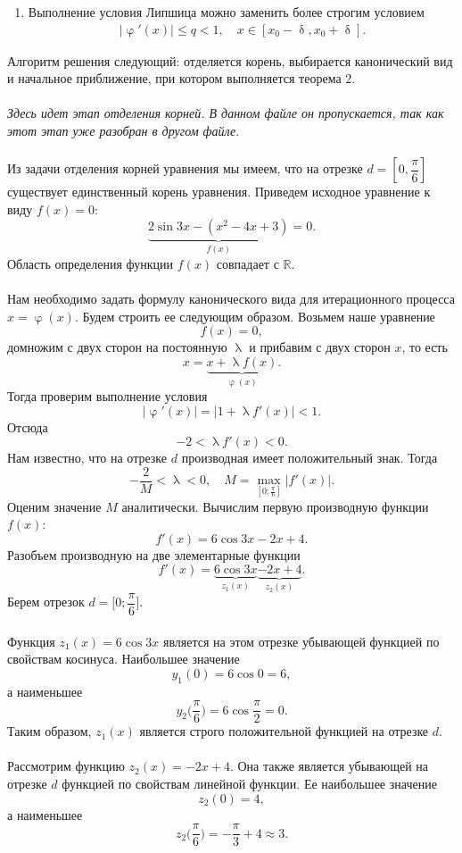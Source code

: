 \documentclass[a4paper, 12pt]{article}
\newcommand{\Rm}{\mathbb{R}}
\renewcommand{\leq}{\leqslant}
\renewcommand{\delta}{\updelta}
\renewcommand{\varphi}{\upvarphi}
\renewcommand{\lambda}{\uplambda}
\begin{document}
\begin{enumerate}
\begin{enumerate}
\begin{enumerate}
			\end{enumerate}
			\item Выполнение условия Липшица можно заменить более строгим условием 
			\begin{eqnarray}
				|\varphi'(x)| \leq q < 1,\quad x \in [x_0-\delta, x_0 + \delta].
			\end{eqnarray}
		\end{enumerate}
		Алгоритм решения следующий: отделяется корень, выбирается канонический вид и начальное приближение, при котором выполняется теорема 2.\\\\
		\textit{Здесь идет этап отделения корней. В данном файле он пропускается, так как этот этап уже разобран в другом файле}.\\\\
		Из задачи отделения корней уравнения мы имеем, что на отрезке $d = \left[0, \dfrac\pi6\right]$ существует единственный корень уравнения. Приведем исходное уравнение к виду $f(x) = 0$: $$\underbrace{2\sin 3x - (x^2 - 4x+3)}_{f(x)} = 0.$$
		Область определения функции $f(x)$ совпадает с $\Rm$.\\\\
		Нам необходимо задать формулу канонического вида для итерационного процесса $x = \varphi(x)$. Будем строить ее следующим образом. Возьмем наше уравнение $$f(x) = 0,$$ домножим с двух сторон на постоянную $\lambda$ и прибавим с двух сторон $x$, то есть $$x = \underbrace{x + \lambda f(x)}_{\varphi(x)}.$$ Тогда проверим выполнение условия $$|\varphi'(x)| = |1 + \lambda f'(x)| < 1.$$
		Отсюда $$-2< \lambda f'(x)< 0.$$ Нам известно, что на отрезке $d$ производная имеет положительный знак. Тогда $$-\dfrac{2}{M} < \lambda < 0,\quad M = \max_{[0; \frac\pi6]}|f'(x)|.$$
		Оценим значение $M$ аналитически. Вычислим первую производную функции $f(x)$:
		$$f'(x) = 6\cos 3x - 2x + 4.$$
		Разобъем производную на две элементарные функции
		$$f'(x) = \underbrace{6\cos3x}_{z_1(x)} \underbrace{- 2x + 4}_{z_2(x)}.$$
		Берем отрезок $d = \Big[0; \dfrac\pi6\Big]$. 
		\\\\
		Функция $z_1(x) = 6\cos3x$ является на этом отрезке убывающей функцией по свойствам косинуса. Наибольшее значение $$y_1(0)= 6\cos0 = 6,$$ а наименьшее $$y_2\Big(\dfrac\pi6\Big) = 6\cos\dfrac\pi2 = 0.$$
		Таким образом, $z_1(x)$ является строго положительной функцией на отрезке $d$. 
		\\\\
		Рассмотрим функцию $z_2(x) = -2x + 4$. Она также является убывающей на отрезке $d$ функцией по свойствам линейной функции. Ее наибольшее значение $$z_2(0) = 4,$$ а наименьшее $$z_2\Big(\dfrac\pi6\Big) = -\dfrac\pi3 + 4\approx 3.$$

\end{enumerate}
\end{document}
